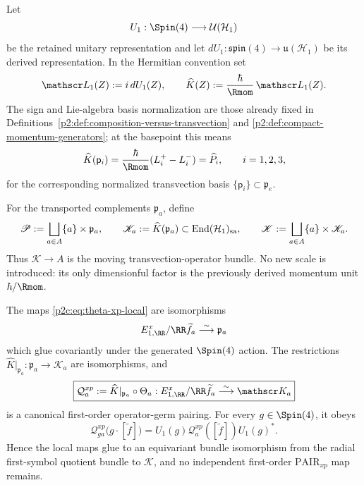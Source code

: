 \documentclass[12pt,a4paper]{article}
\begin{document}
\begin{definition}
\label{p2c:def:moving-transvection-operator-bundle}
Let
\[
 U_1:\Spin(4)\longrightarrow\mathcal U(\mathcal H_1)
\]
be the retained unitary representation and let
\(dU_1:\mathfrak{spin}(4)\to\mathfrak u(\mathcal H_1)\) be its derived
representation.  In the Hermitian convention set
\[
 \mathscr L_1(Z):=i\,dU_1(Z),
 \qquad
 \widehat K(Z):=\frac{\hbar}{\Rmom}\,\mathscr L_1(Z).
\]
The sign and Lie-algebra basis normalization are those already fixed in
Definitions~\ref{p2:def:composition-versus-transvection} and
\ref{p2:def:compact-momentum-generators}; at the basepoint this means
\begin{equation}
 \label{p2c:eq:Khat-basepoint-normalization}
 \widehat K(\mathsf p_i)
 =\frac{\hbar}{\Rmom}(L_i^+-L_i^-)
 =\widehat P_i,
 \qquad i=1,2,3,
\end{equation}
for the corresponding normalized transvection basis
\(\{\mathsf p_i\}\subset\mathfrak p_e\).

For the transported complements \(\mathfrak p_a\), define
\[
 \mathscr P:=\bigsqcup_{a\in A}\{a\}\times\mathfrak p_a,
 \qquad
 \mathscr K_a:=\widehat K(\mathfrak p_a)
 \subset\operatorname{End}(\mathcal H_1)_{\rm sa},
 \qquad
 \mathscr K:=\bigsqcup_{a\in A}\{a\}\times\mathscr K_a.
\]
Thus \(\mathscr K\to A\) is the moving transvection-operator bundle.  No
new scale is introduced: its only dimensionful factor is the previously
derived momentum unit \(\hbar/\Rmom\).
\end{definition}

\begin{theorem}
\label{p2c:thm:operator-germ-xp-pairing}
The maps \eqref{p2c:eq:theta-xp-local} are isomorphisms
\[
 E_{1,\RR}^x/\RR\widetilde f_a\overset\sim\longrightarrow\mathfrak p_a
\]
which glue covariantly under the generated $\Spin(4)$ action.  The restrictions
\(\widehat K|_{\mathfrak p_a}:\mathfrak p_a\to\mathscr K_a\) are
isomorphisms, and
\[
 \boxed{
 \mathcal Q_a^{xp}
 :=\widehat K|_{\mathfrak p_a}\circ\Theta_a:
 E_{1,\RR}^x/\RR\widetilde f_a
 \overset\sim\longrightarrow\mathscr K_a}
\]
is a canonical first-order operator-germ pairing.  For every
\(g\in\Spin(4)\), it obeys
\begin{equation}
 \label{p2c:eq:operator-germ-covariance}
 \mathcal Q_{ga}^{xp}\bigl(g\cdot[\widetilde f]\bigr)
 =U_1(g)\mathcal Q_a^{xp}([\widetilde f])U_1(g)^*.
\end{equation}
Hence the local maps glue to an equivariant bundle isomorphism
from the radial first-symbol quotient bundle to \(\mathscr K\), and no
independent first-order \(\mathrm{PAIR}_{xp}\) map remains.
\end{theorem}
\end{document}
